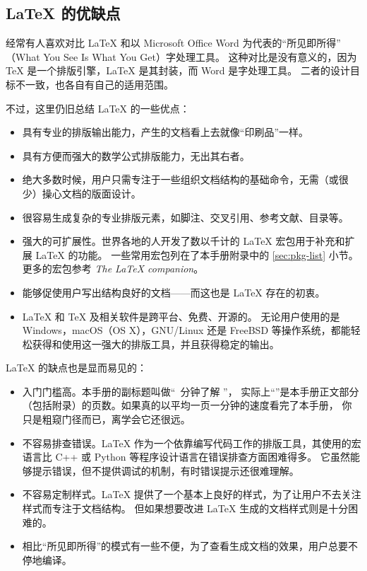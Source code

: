 \subsection{\LaTeX{} 的优缺点}\label{subec:advs}

经常有人喜欢对比 \LaTeX{} 和以 Microsoft Office Word 为代表的“所见即所得”%
（What You See Is What You Get）字处理工具。
这种对比是没有意义的，因为 \TeX{} 是一个排版引擎，\LaTeX{} 是其封装，而 Word 是字处理工具。
二者的设计目标不一致，也各自有自己的适用范围。

不过，这里仍旧总结 \LaTeX{} 的一些优点：
\begin{itemize}
  \item 具有专业的排版输出能力，产生的文档看上去就像“印刷品”一样。
  \item 具有方便而强大的数学公式排版能力，无出其右者。
  \item 绝大多数时候，用户只需专注于一些组织文档结构的基础命令，无需（或很少）操心文档的版面设计。
  \item 很容易生成复杂的专业排版元素，如脚注、交叉引用、参考文献、目录等。
  \item 强大的可扩展性。世界各地的人开发了数以千计的 \LaTeX{} 宏包用于补充和扩展 \LaTeX{} 的功能。
  一些常用宏包列在了本手册附录中的 \ref{sec:pkg-list} 小节。更多的宏包参考 \textit{The \LaTeX{} companion}\cite{companion}。
  \item 能够促使用户写出结构良好的文档——而这也是 \LaTeX{} 存在的初衷。
  \item \LaTeX{} 和 \TeX{} 及相关软件是跨平台、免费、开源的。
  无论用户使用的是 Windows，macOS（OS X），GNU/Linux 还是 FreeBSD 等操作系统，都能轻松获得和使用这一强大的排版工具，并且获得稳定的输出。
\end{itemize}

\LaTeX{} 的缺点也是显而易见的：
\begin{itemize}
  \item 入门门槛高。本手册的副标题叫做“\pageref{lshort-minutes}~分钟了解 \LaTeXe”，
  实际上“\pageref{lshort-minutes}”是本手册正文部分（包括附录）的页数。如果真的以平均一页一分钟的速度看完了本手册，
  你只是粗窥门径而已，离学会它还很远。
  \item 不容易排查错误。\LaTeX{} 作为一个依靠编写代码工作的排版工具，其使用的宏语言比 C++ 或 Python 等程序设计语言在错误排查方面困难得多。
  它虽然能够提示错误，但不提供调试的机制，有时错误提示还很难理解。
  \item 不容易定制样式。\LaTeX{} 提供了一个基本上良好的样式，为了让用户不去关注样式而专注于文档结构。
  但如果想要改进 \LaTeX{} 生成的文档样式则是十分困难的。
  \item 相比“所见即所得”的模式有一些不便，为了查看生成文档的效果，用户总要不停地编译。
\end{itemize}

